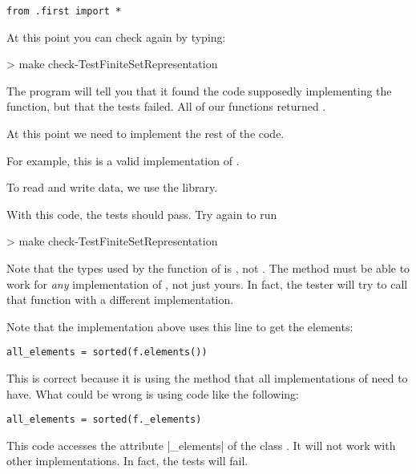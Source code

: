 \begin{verbatim}
from .first import *
\end{verbatim}

At this point you can check again by typing:

\begin{console}
  > make check-TestFiniteSetRepresentation
\end{console}

The program will tell you that it found the code supposedly implementing the function,
but that the tests failed. All of our functions returned .

At this point we need to implement the rest of the code.

For example, this is a valid implementation of .



To read and write data, we use the  library.


With this code, the tests should pass. Try again to run

\begin{console}
  > make check-TestFiniteSetRepresentation
\end{console}

Note that the types used by the function  of  is ,
not . The method must be able to work for \emph{any} implementation of  ,
not just yours. In fact, the tester will try to call that function with a different implementation.

Note that the implementation above uses this line to get the elements:
\begin{verbatim}
all_elements = sorted(f.elements())
\end{verbatim}
This is correct because it is using the method  that all implementations of  
need to have. What could be wrong is using code like the following:
\begin{verbatim}
all_elements = sorted(f._elements)
\end{verbatim}
This code accesses the attribute \pystr|_elements| of the class .
It will not work with other implementations. In fact, the tests will fail.

